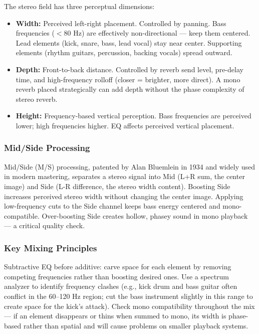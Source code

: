 \documentclass[11pt,letterpaper]{article}
\begin{document}
The stereo field has three perceptual dimensions:
\begin{itemize}
  \item \textbf{Width:} Perceived left-right placement. Controlled by panning. Bass frequencies ($<$80 Hz) are effectively non-directional --- keep them centered. Lead elements (kick, snare, bass, lead vocal) stay near center. Supporting elements (rhythm guitars, percussion, backing vocals) spread outward.
  \item \textbf{Depth:} Front-to-back distance. Controlled by reverb send level, pre-delay time, and high-frequency rolloff (closer = brighter, more direct). A mono reverb placed strategically can add depth without the phase complexity of stereo reverb.
  \item \textbf{Height:} Frequency-based vertical perception. Bass frequencies are perceived lower; high frequencies higher. EQ affects perceived vertical placement.
\end{itemize}

\subsubsection{Mid/Side Processing}

Mid/Side (M/S) processing, patented by Alan Bluemlein in 1934 and widely used in modern mastering, separates a stereo signal into Mid (L+R sum, the center image) and Side (L-R difference, the stereo width content). Boosting Side increases perceived stereo width without changing the center image. Applying low-frequency cuts to the Side channel keeps bass energy centered and mono-compatible. Over-boosting Side creates hollow, phasey sound in mono playback --- a critical quality check.

\subsubsection{Key Mixing Principles}

Subtractive EQ before additive: carve space for each element by removing competing frequencies rather than boosting desired ones. Use a spectrum analyzer to identify frequency clashes (e.g., kick drum and bass guitar often conflict in the 60--120 Hz region; cut the bass instrument slightly in this range to create space for the kick's attack). Check mono compatibility throughout the mix --- if an element disappears or thins when summed to mono, its width is phase-based rather than spatial and will cause problems on smaller playback systems.
\end{document}
